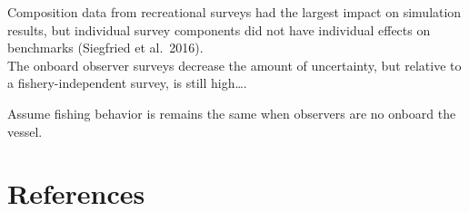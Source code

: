 \documentclass[]{elsarticle} %
\begin{document}
Composition data from recreational surveys had the largest impact on
simulation results, but individual survey components did not have
individual effects on benchmarks (Siegfried et al.~2016).\\
The onboard observer surveys decrease the amount of uncertainty, but
relative to a fishery-independent survey, is still high\ldots.

Assume fishing behavior is remains the same when observers are no
onboard the vessel.

\hypertarget{references}{%
\section*{References}\label{references}}

\hypertarget{refs}{}
\end{document}
